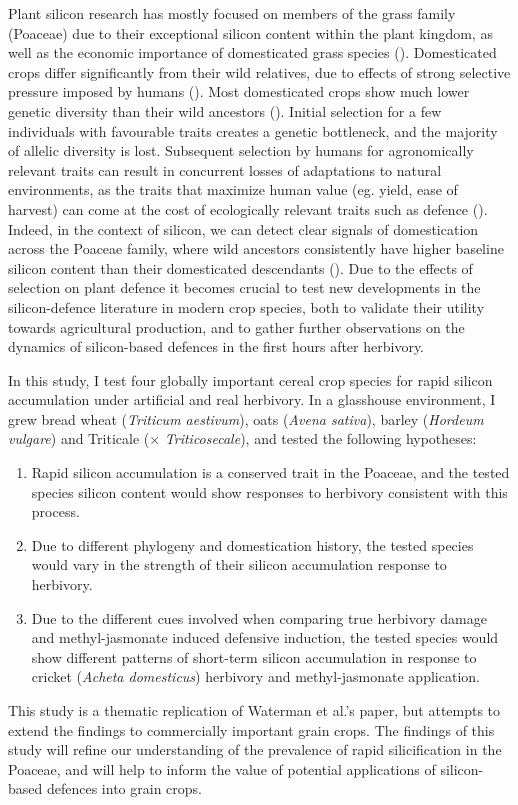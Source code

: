 \documentclass[12pt, letterpaper, ]{article}
\begin{document}
Plant silicon research has mostly focused on members of the grass family (Poaceae) due to their exceptional silicon content within the plant kingdom, as well as the economic importance of domesticated grass species (\cite{reynolds_silicon_2016}). Domesticated crops differ significantly from their wild relatives, due to effects of strong selective pressure imposed by humans (\cite{chen_crop_2015}). Most domesticated crops show much lower genetic diversity than their wild ancestors (\cite{hafeez_creation_2021, smith_domestication_2019}). Initial selection for a few individuals with favourable traits creates a genetic bottleneck, and the majority of allelic diversity is lost. Subsequent selection by humans for agronomically relevant traits can result in concurrent losses of adaptations to natural environments, as the traits that maximize human value (eg. yield, ease of harvest) can come at the cost of ecologically relevant traits such as defence (\cite{whitehead_domestication_2017, chen_crop_2015}). Indeed, in the context of silicon, we can detect clear signals of domestication across the Poaceae family, where wild ancestors consistently have higher baseline silicon content than their domesticated descendants (\cite{simpson_still_2017}). Due to the effects of selection on plant defence it becomes crucial to test new developments in the silicon-defence literature in modern crop species, both to validate their utility towards agricultural production, and to gather further observations on the dynamics of silicon-based defences in the first hours after herbivory.

In this study, I test four globally important cereal crop species for rapid silicon accumulation under artificial and real herbivory. In a glasshouse environment, I grew bread wheat (\textit{Triticum aestivum}), oats (\textit{Avena sativa}), barley (\textit{Hordeum vulgare}) and Triticale ($\times$ \textit{Triticosecale}), and tested the following hypotheses:
\begin{enumerate}
        \item Rapid silicon accumulation is a conserved trait in the Poaceae, and the tested species silicon content would show responses to herbivory consistent with this process.
        \item Due to different phylogeny and domestication history, the tested species would vary in the strength of their silicon accumulation response to herbivory. 
        \item Due to the different cues involved when comparing true herbivory damage and methyl-jasmonate induced defensive induction, the tested species would show different patterns of short-term silicon accumulation in response to cricket (\textit{Acheta domesticus}) herbivory and methyl-jasmonate application. 
\end{enumerate}
This study is a thematic replication of Waterman et al.’s  paper, but attempts to extend the findings to commercially important grain crops. The findings of this study will refine our understanding of the prevalence of rapid silicification in the Poaceae, and will help to inform the value of potential applications of silicon-based defences into grain crops.
\end{document}
